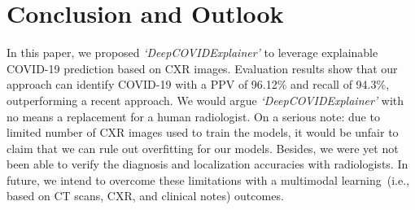 \documentclass[conference]{IEEEtran}
\begin{document}

\section{Conclusion and Outlook}
\label{sec:co}
In this paper, we proposed \emph{`DeepCOVIDExplainer'} to leverage explainable COVID-19 prediction based on CXR images. Evaluation results show that our approach can identify COVID-19 with a PPV of 96.12\% and recall of 94.3\%, outperforming a recent approach. 
We would argue \emph{`DeepCOVIDExplainer'} 
with no means a replacement for a human radiologist. 
On a serious note: due to limited number of CXR images used to train the models, it would be unfair to claim that we can rule out overfitting for our models. 
Besides, we were yet not been able to verify the diagnosis and localization accuracies with  radiologists. 
In future, we intend to overcome these limitations with a multimodal learning~(i.e., based on CT scans, CXR, and clinical notes) outcomes.



\end{document}
